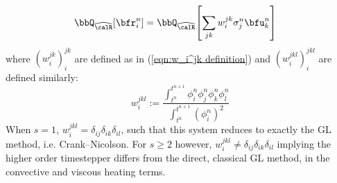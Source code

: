 \begin{example}
\begin{align}
                \bbQ_{\widehat{\calR}}\!\left[\bfr_{i}^{n}\right]
                &=
                \bbQ_{\widehat{\calR}}\!\left[\sum_{jk}w_{i}^{jk}\sigma_{j}^{n}\bfu_{k}^{n}\right]
        \end{align}
        where $\left(w_{i}^{jk}\right)_{i}^{jk}$ are defined as in (\ref{eqn:w_i^jk definition}) and $\left(w_{i}^{jkl}\right)_{i}^{jkl}$ are defined similarly:
        \begin{equation}
            w_{i}^{jkl}  :=  \frac{\int_{t^{n}}^{t^{n + 1}}\phi^{n}_{i}\phi^{n}_{j}\phi^{n}_{k}\phi^{n}_{l}}{\int_{t^{n}}^{t^{n + 1}}(\phi^{n}_{i})^{2}}
        \end{equation}
        When $s = 1$, $w_{i}^{jkl} = \delta_{ij}\delta_{ik}\delta_{il}$, such that this system reduces to exactly the GL method, i.e. Crank--Nicolson. For $s \geq 2$ however, $w_{i}^{jkl} \neq \delta_{ij}\delta_{ik}\delta_{il}$ implying the higher order timestepper differs from the direct, classical GL method, in the convective and viscous heating terms.
    \end{example}
    